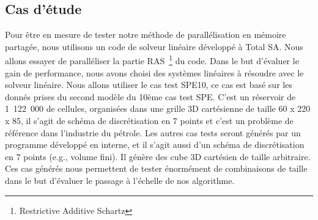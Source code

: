 \subsection{Cas d'étude}
Pour être en mesure de tester notre méthode de parallélisation en mémoire partagée, nous utilisons un code de solveur linéaire développé à Total SA.
%
Nous allons essayer de paralléliser la partie RAS~\footnote{Restrictive Additive Schartz} du code.
%
Dans le but d'évaluer le gain de performance, nous avons choisi des systèmes linéaires à résoudre avec le solveur linéaire.
%
Nous allons utiliser le cas test SPE10, ce cas est basé sur les donnés prises du second modèle du 10ème cas test SPE\cite{SPE10}.
%
C'est un réservoir de 1~122~000 de cellules, organisées dans une grille 3D cartésienne de taille 60 x 220 x 85, il s'agit de schéma de discrétisation en 7 points et c'est un problème de référence dans l'industrie du pétrole.
%
Les autres cas tests seront générés par un programme développé en interne, et il s'agit aussi d'un schéma de discrétisation en 7 points (e.g., volume fini).
%
Il génère des cube 3D cartésien de taille arbitraire.
%
Ces cas générés nous permettent de tester énormément de combinaisons de taille dans le but d'évaluer le passage à l'échelle de nos algorithme.
